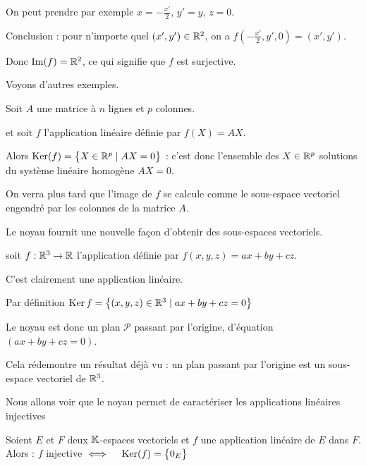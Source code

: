 On peut prendre par exemple $x = -\frac{x'}{2}$, $y'=y$, $z=0$.

\change

Conclusion : pour n'importe quel $(x',y') \in \mathbb{R}^2$, on a
$f(-\frac{x'}{2},y',0) = (x',y')$. 

\change

Donc $\mathop{\text{Im}}\nolimits(f)= \mathbb{R}^2$, ce qui signifie que $f$ est surjective.


\diapo

Voyons d'autres exemples.


Soit $A$ une matrice à $n$ lignes et $p$ colonnes.

\change

et soit $f$ l'application linéaire définie par $f(X) = AX$.

\change


Alors $\mathop{\text{Ker}}\nolimits(f) = \big\{ X \in \mathbb{R}^p \mid AX=0 \big\}$ : c'est donc l'ensemble des $X \in \mathbb{R}^p$
solutions du système linéaire homogène $AX=0$. 

\change

On verra plus tard que l'image de $f$ se calcule comme le sous-espace vectoriel engendré 
par les colonnes de la matrice $A$.

\change


Le noyau fournit une nouvelle façon d'obtenir des sous-espaces vectoriels.

soit $f : \mathbb{R}^3 \to \mathbb{R}$ l'application définie par $f(x,y,z)=ax+by+cz$.

C'est clairement une application linéaire.

\change

Par définition $\mathop{\text{Ker}}\nolimits f = \big\{ (x,y,z) \in \mathbb{R}^3 \mid ax+by+cz=0 \big\}$

\change

Le noyau est donc un plan $\mathcal{P}$ passant par l'origine, d'équation $(ax+by+cz=0)$.

\change

Cela rédemontre un résultat déjà vu : un plan passant par l'origine est un sous-espace vectoriel de $\mathbb{R}^3$.



\diapo

Nous allons voir que le noyau permet de caractériser les applications linéaires injectives


Soient $E$ et $F$ deux $\mathbb{K}$-espaces vectoriels et $f$ une application linéaire de $E$ dans $F$. Alors :
$f$ injective \quad $\iff \quad \mathop{\text{Ker}}\nolimits(f) = \big\{0_E\big\}$


